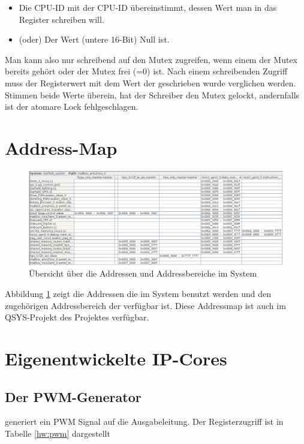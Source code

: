 \begin{itemize}
	\begin{itemize}
		\item Die CPU-ID mit der CPU-ID übereinstimmt, dessen Wert man in das Register schreiben will.
		\item (oder) Der Wert (untere 16-Bit) Null ist.
	\end{itemize}
	Man kann also nur schreibend auf den Mutex zugreifen, wenn einem der Mutex bereits gehört oder der Mutex frei (=0) ist. Nach einem schreibenden Zugriff muss der Registerwert mit dem Wert der geschrieben wurde verglichen werden. Stimmen beide Werte überein, hat der Schreiber den Mutex gelockt, andernfalls ist der atomare Lock fehlgeschlagen.
\end{itemize}

\section{Address-Map}

\begin{figure}
	\includegraphics[width=\textwidth]{Abb/Address_Map.png}
	\caption{Übersicht über die Addressen und Addressbereiche im System}
	\label{FPGA:AddrMap}
\end{figure}

Abbildung \ref{FPGA:AddrMap} zeigt die Addressen die im System benutzt werden und den zugehörigen Addressbereich der verfügbar ist. Diese Addressmap ist auch im QSYS-Projekt des Projektes verfügbar.

\section{Eigenentwickelte \ac{IP}-Cores}

\subsection{Der PWM-Generator} generiert ein PWM Signal auf die Ausgabeleitung. Der Registerzugriff ist in Tabelle \ref{hw:pwm} dargestellt

